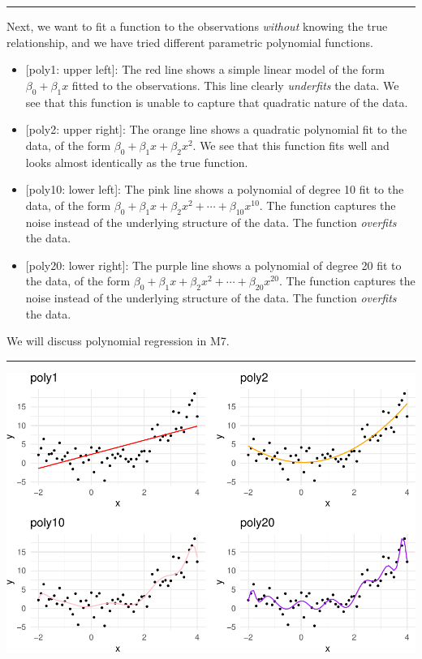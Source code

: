 \documentclass[]{article}
\providecommand{\tightlist}{%
  \setlength{\itemsep}{0pt}\setlength{\parskip}{0pt}}
\begin{document}
\begin{center}\rule{0.5\linewidth}{\linethickness}\end{center}

Next, we want to fit a function to the observations \emph{without}
knowing the true relationship, and we have tried different parametric
polynomial functions.

\begin{itemize}
\tightlist
\item
  {{[}poly1: upper left{]}}: The {red} line shows a simple linear model
  of the form \(\beta_0+\beta_1 x\) fitted to the observations. This
  line clearly \emph{underfits} the data. We see that this function is
  unable to capture that quadratic nature of the data.
\item
  {{[}poly2: upper right{]}}: The {orange} line shows a quadratic
  polynomial fit to the data, of the form
  \(\beta_0+\beta_1 x +\beta_2 x^2\). We see that this function fits
  well and looks almost identically as the true function.
\item
  {{[}poly10: lower left{]}}: The {pink} line shows a polynomial of
  degree 10 fit to the data, of the form
  \(\beta_0+\beta_1 x +\beta_2 x^2+\cdots +\beta_{10}x^{10}\). The
  function captures the noise instead of the underlying structure of the
  data. The function \emph{overfits} the data.
\item
  {{[}poly20: lower right{]}}: The {purple} line shows a polynomial of
  degree 20 fit to the data, of the form
  \(\beta_0+\beta_1 x +\beta_2 x^2+\cdots +\beta_{20}x^{20}\). The
  function captures the noise instead of the underlying structure of the
  data. The function \emph{overfits} the data.
\end{itemize}

We will discuss polynomial regression in M7.

\begin{center}\rule{0.5\linewidth}{\linethickness}\end{center}

\includegraphics{2StatLearn_files/figure-latex/overunderfit-1.pdf}
\end{document}
